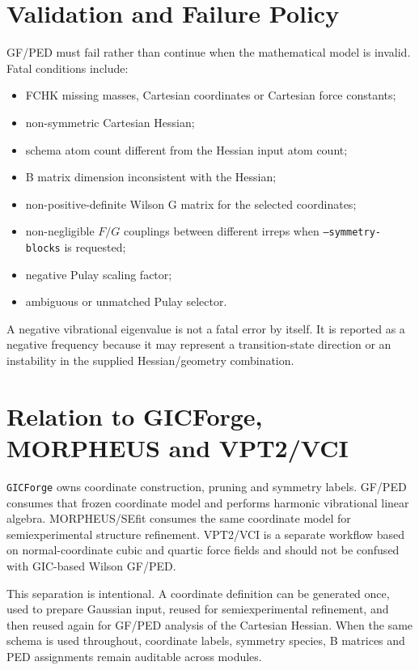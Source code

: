 \documentclass[11pt]{article}
\newcommand{\gicforge}{\texttt{GICForge}}
\begin{document}
\section{Validation and Failure Policy}

GF/PED must fail rather than continue when the mathematical model is invalid.
Fatal conditions include:

\begin{itemize}
  \item FCHK missing masses, Cartesian coordinates or Cartesian force constants;
  \item non-symmetric Cartesian Hessian;
  \item schema atom count different from the Hessian input atom count;
  \item B matrix dimension inconsistent with the Hessian;
  \item non-positive-definite Wilson G matrix for the selected coordinates;
  \item non-negligible \(F/G\) couplings between different irreps when
  \texttt{--symmetry-blocks} is requested;
  \item negative Pulay scaling factor;
  \item ambiguous or unmatched Pulay selector.
\end{itemize}

\noindent
A negative vibrational eigenvalue is not a fatal error by itself.  It is
reported as a negative frequency because it may represent a transition-state
direction or an instability in the supplied Hessian/geometry combination.

\section{Relation to GICForge, MORPHEUS and VPT2/VCI}

\gicforge{} owns coordinate construction, pruning and symmetry labels.
GF/PED consumes that frozen coordinate model and performs harmonic vibrational
linear algebra.  MORPHEUS/SEfit consumes the same coordinate model for
semiexperimental structure refinement.  VPT2/VCI is a separate workflow based
on normal-coordinate cubic and quartic force fields and should not be confused
with GIC-based Wilson GF/PED.

This separation is intentional.  A coordinate definition can be generated once,
used to prepare Gaussian input, reused for semiexperimental refinement, and
then reused again for GF/PED analysis of the Cartesian Hessian.  When the same
schema is used throughout, coordinate labels, symmetry species, B matrices and
PED assignments remain auditable across modules.
\end{document}
